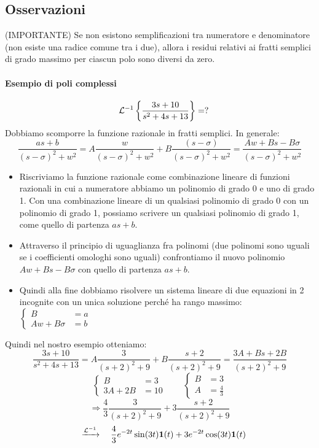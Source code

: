 \documentclass[../main.tex]{subfiles}
\begin{document}
	\subsection{Osservazioni}
		(IMPORTANTE) Se non esistono semplificazioni tra numeratore e denominatore (non esiste una radice comune tra i due), allora i residui relativi ai fratti semplici di grado massimo per ciascun polo sono diversi da zero.
	
	\begin{mdframed}[style=Esempio]
		\paragraph{Esempio di poli complessi}
			\[
				\quad \mathcal{L}^{-1} \left\lbrace \frac{3s+10}{s^2+4s+13} \right\rbrace = ?
			\]
			Dobbiamo scomporre la funzione razionale in fratti semplici. In generale:
			\[
				\frac{as+b}{(s-\sigma)^2 + w^2} = A \frac{w}{(s-\sigma)^2 + w^2} + B \frac{(s-\sigma)}{(s-\sigma)^2 + w^2} = \frac{Aw +Bs- B\sigma}{(s-\sigma)^2 + w^2}
			\]
			\begin{itemize}
				\item
					Riscriviamo la funzione razionale come combinazione lineare di funzioni razionali in cui a numeratore abbiamo un polinomio di grado 0 e uno di grado 1. Con una combinazione lineare di un qualsiasi polinomio di grado 0 con un polinomio di grado 1, possiamo scrivere un qualsiasi polinomio di grado 1, come quello di partenza $ as+b $.
				\item
					Attraverso il principio di uguaglianza fra polinomi (due polinomi sono uguali se i coefficienti omologhi sono uguali) confrontiamo il nuovo polinomio $ Aw +Bs- B\sigma $ con quello di partenza $ as+b $.
				\item
					Quindi alla fine dobbiamo risolvere un sistema lineare di due equazioni in 2 incognite con un unica soluzione perch\'{e} ha rango massimo:  
					$ \begin{cases} B &= a\\Aw + B\sigma &= b \end{cases} $
			\end{itemize}
			Quindi nel nostro esempio otteniamo:
			\[
				\frac{3s+10}{s^2+4s+13} = A\frac{3}{(s+2)^2+9} + B\frac{s+2}{(s+2)^2+9} = \frac{3A + Bs + 2B}{(s+2)^2+9}
			\]
			\[ 
				\begin{cases}
					B &= 3
					\\
					3A + 2B &= 10
				\end{cases} \qquad
				\begin{cases}
					B &= 3
					\\
					A &= \frac{4}{3}
				\end{cases} 
			\]
			\[
				\Rightarrow \frac{4}{3} \frac{3}{(s+2)^2+9} + 3 \frac{s+2}{(s+2)^2+9}
			\]
			\[
				\quad \xrightarrow{\mathcal{L}^{-1}} \quad \frac{4}{3} e^{-2t} \sin(3t) \textbf{1}(t) + 3 e^{-2t} \cos(3t) \textbf{1}(t)
			\]
		\end{mdframed}
\end{document}
